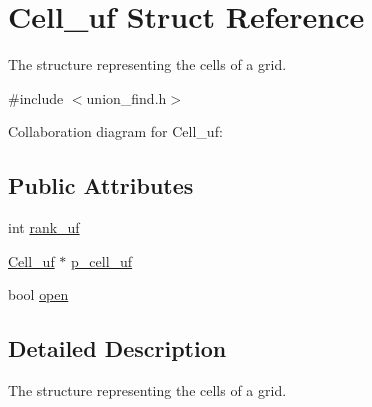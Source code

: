 \hypertarget{structCell__uf}{\section{Cell\-\_\-uf Struct Reference}
\label{structCell__uf}
}


The structure representing the cells of a grid.  




{\ttfamily \#include $<$union\-\_\-find.\-h$>$}



Collaboration diagram for Cell\-\_\-uf\-:
\subsection*{Public Attributes}
\begin{DoxyCompactItemize}
\item 
int \hyperlink{structCell__uf_a272e6bb64ee809225211393bf813cb1e}{rank\-\_\-uf}
\item 
\hyperlink{structCell__uf}{Cell\-\_\-uf} $\ast$ \hyperlink{structCell__uf_aea34c140208c634953b66842d148a1cb}{p\-\_\-cell\-\_\-uf}
\item 
bool \hyperlink{structCell__uf_a9dd3368bae499fe43d1ecf976d278a92}{open}
\end{DoxyCompactItemize}


\subsection{Detailed Description}
The structure representing the cells of a grid. 

